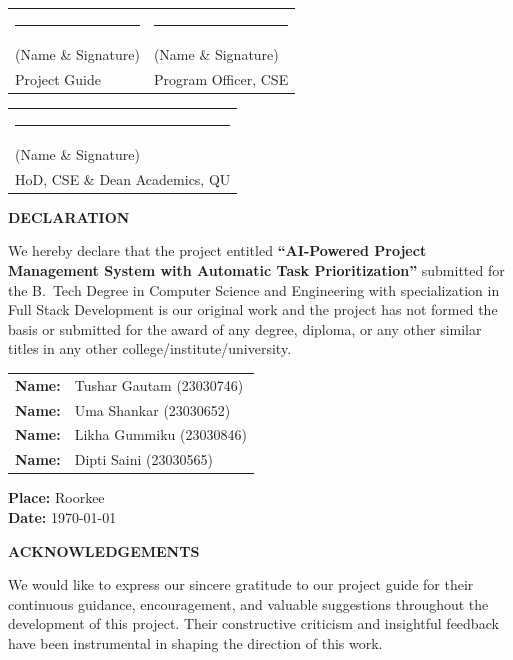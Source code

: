 \documentclass[12pt,a4paper,oneside]{report}
\begin{document}
\vspace{3cm}
\noindent
\begin{tabular}{p{6cm}p{6cm}}
\rule{5cm}{0.4pt} & \rule{5cm}{0.4pt} \\
(Name \& Signature)          & (Name \& Signature) \\
Project Guide                & Program Officer, CSE \\
\end{tabular}

\vspace{2.5cm}
\noindent
\begin{tabular}{p{6cm}}
\rule{5cm}{0.4pt} \\
(Name \& Signature) \\
HoD, CSE \& Dean Academics, QU \\
\end{tabular}
\thispagestyle{plain}

\newpage
\begin{center}
{\large\textbf{DECLARATION}}
\end{center}
\vspace{1cm}
\noindent
We hereby declare that the project entitled \textbf{``AI-Powered Project Management System with Automatic Task Prioritization''} submitted for the B.\ Tech Degree in Computer Science and Engineering with specialization in Full Stack Development is our original work and the project has not formed the basis or submitted for the award of any degree, diploma, or any other similar titles in any other college/institute/university.

\vspace{2.5cm}
\noindent
\begin{tabular}{ll}
\textbf{Name:} & Tushar Gautam (23030746) \\
\textbf{Name:} & Uma Shankar (23030652) \\
\textbf{Name:} & Likha Gummiku (23030846) \\
\textbf{Name:} & Dipti Saini (23030565) \\
\end{tabular}

\vspace{1.5cm}
\noindent
\textbf{Place:} Roorkee\\
\textbf{Date:} \today
\thispagestyle{plain}

\newpage
\begin{center}
{\large\textbf{ACKNOWLEDGEMENTS}}
\end{center}
\vspace{1cm}
\noindent
We would like to express our sincere gratitude to our project guide for their continuous guidance, encouragement, and valuable suggestions throughout the development of this project. Their constructive criticism and insightful feedback have been instrumental in shaping the direction of this work.
\end{document}
